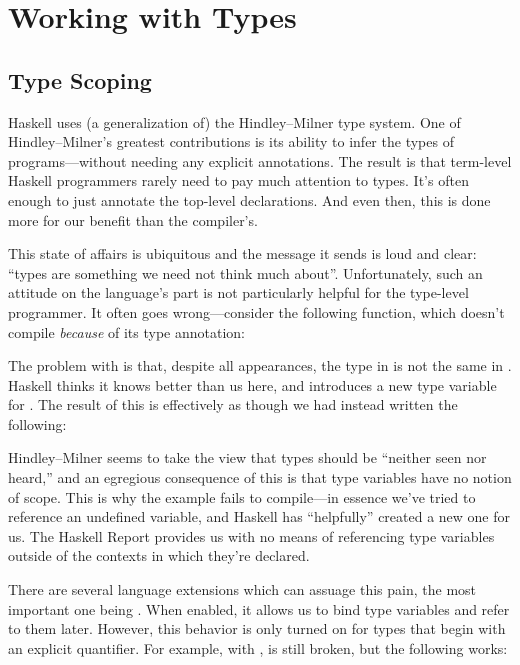 \documentclass[book.tex]{subfiles}
\begin{document}
\chapter{Working with Types}

\section{Type Scoping}

Haskell uses (a generalization of) the Hindley--Milner type system. One of
Hindley--Milner's greatest contributions is its ability to infer the types of
programs---without needing any explicit annotations. The result is that term-level
Haskell programmers rarely need to pay much attention to types. It's often
enough to just annotate the top-level declarations. And even then, this is
done more for our benefit than the compiler's.

This state of affairs is ubiquitous and the message it sends is loud and clear:
``types are something we need not think much about''. Unfortunately,
such an attitude on the language's part is not particularly helpful for the
type-level programmer. It often goes wrong---consider the following function,
which doesn't compile \emph{because} of its type annotation:


The problem with  is that, despite all appearances, the type  in
 is not the same  in . Haskell thinks it knows better
than us here, and introduces a new type variable for . The result of
this is effectively as though we had instead written the following:


Hindley--Milner seems to take the view that types should be ``neither seen nor
heard,'' and an egregious consequence of this is that type variables have no
notion of scope.  This is why the example fails to compile---in essence we've
tried to reference an undefined variable, and Haskell has ``helpfully'' created
a new one for us. The Haskell Report provides us with no means of referencing
type variables outside of the contexts in which they're declared.

There are several language extensions which can assuage this pain, the most
important one being . When
enabled, it allows us to bind type variables and refer to them later. However,
this behavior is only turned on for types that begin with an explicit
 quantifier. For example, with ,
\; is still broken, but the following works:
\end{document}
